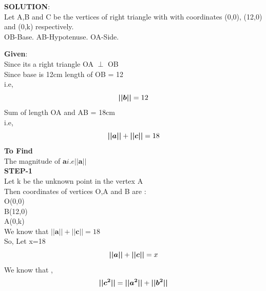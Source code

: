 \documentclass[10pt,a4paper]{report}
\begin{document}
\begin{multicols}{2}
\raggedright \textbf{SOLUTION}:\vspace{2mm}\\
Let A,B and C be the vertices of right triangle with with coordinates (0,0), (12,0) and (0,k) respectively.\vspace{2mm}\\
OB-Base.
AB-Hypotenuse.
OA-Side.\\\vspace{2mm}
\raggedright \textbf{Given}:\vspace{2mm}\\
Since its a right triangle OA $\perp$ OB \\\vspace{2mm}
Since base is 12cm length of OB = 12  \\i.e,\\
\begin{equation}
\boldsymbol{||b||}= 12 \vspace{2mm}
\end{equation}
Sum of length OA and AB = 18cm \\ i.e,\\
\begin{equation}
\boldsymbol{||a||} + \boldsymbol{||c||}= 18 \vspace{2mm}
\end{equation}
\textbf{To Find}\vspace{2mm}\\
The magnitude of $\boldsymbol{a} i.e  \boldsymbol{||a||}$\\\vspace{2mm}
\textbf{STEP-1}\vspace{2mm}\\
Let k be the unknown point in the vertex A \vspace{2mm}\\
Then coordinates of vertices  O,A and B are :\vspace{2mm}\\
 O(0,0)\vspace{1mm} \\ B(12,0)\vspace{1mm} \\A(0,k)\vspace{1mm} \\
\vspace{3mm} 
We know that $\boldsymbol{||a||} + \boldsymbol{||c||}= 18 $\vspace{2mm}\\
So, Let x=18 
\begin{equation}
    \boldsymbol{||a||} + \boldsymbol{||c||}= x \vspace{2mm}
\end{equation}
We know that , \\
\begin{equation}
    \boldsymbol{||c^2||} = \boldsymbol{||a^2||} + \boldsymbol{||b^2||} \vspace{2mm}
\end{equation}


\end{multicols}
\end{document}
